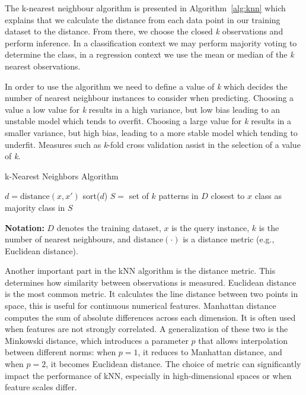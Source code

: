 \documentclass[10pt, conference]{IEEEtran}
\begin{document}
The k-nearest neighbour algorithm is presented in Algorithm~\ref{alg:knn} which explains that we calculate the distance from each data point in our training dataset to the distance. From there, we choose the closed \textit{k} observations and perform inference. In a classification context we may perform majority voting to determine the class, in a regression context we use the mean or median of the \textit{k} nearest observations.

In order to use the algorithm we need to define a value of \textit{k} which decides the number of nearest neighbour instances to consider when predicting. Choosing a value a low value for \textit{k} results in a high variance, but low bias leading to an unstable model which tends to overfit. Choosing a large value for \textit{k} results in a smaller variance, but high bias, leading to a more stable model which tending to underfit. Measures such as \textit{k}-fold cross validation assist in the selection of a value of \textit{k}.

\begin{algorithm}[htbp]
\caption{k-Nearest Neighbors Algorithm}
\label{alg:knn}
\begin{algorithmic}
\State $d = \text{distance}(x, x')$
\EndFor
\State sort($d$)
\State $S = $ set of $k$ patterns in $D$ closest to $x$
\State \Return class as majority class in $S$
\EndFunction
\end{algorithmic}
\end{algorithm}
\noindent
\textbf{Notation:} $D$ denotes the training dataset, $x$ is the query instance, $k$ is the number of nearest neighbours, and $\text{distance}(\cdot)$ is a distance metric (e.g., Euclidean distance).

Another important part in the kNN algorithm is the distance metric. This determines how similarity between observations is measured. Euclidean distance is the most common metric. It calculates the line distance between two points in space, this is useful for continuous numerical features. Manhattan distance computes the sum of absolute differences across each dimension. It is often used when features are not strongly correlated. A generalization of these two is the Minkowski distance, which introduces a parameter \(p\) that allows interpolation between different norms: when \(p = 1\), it reduces to Manhattan distance, and when \(p = 2\), it becomes Euclidean distance. The choice of metric can significantly impact the performance of kNN, especially in high-dimensional spaces or when feature scales differ.
\end{document}
